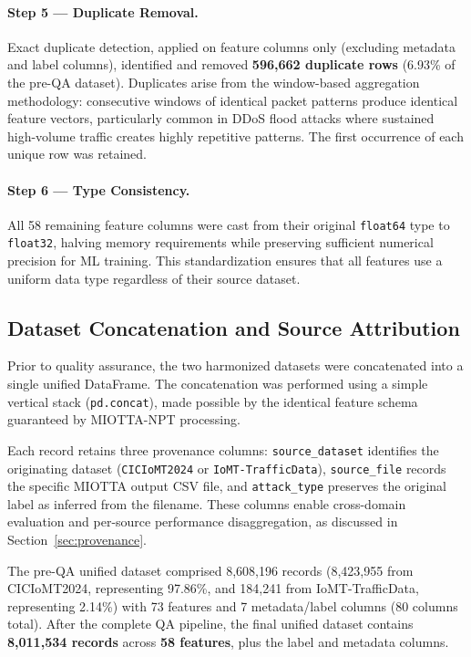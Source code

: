 \paragraph{Step 5 --- Duplicate Removal.}
Exact duplicate detection, applied on feature columns only (excluding metadata and label columns), identified and removed \textbf{596,662 duplicate rows} (6.93\% of the pre-QA dataset). Duplicates arise from the window-based aggregation methodology: consecutive windows of identical packet patterns produce identical feature vectors, particularly common in DDoS flood attacks where sustained high-volume traffic creates highly repetitive patterns. The first occurrence of each unique row was retained.

\paragraph{Step 6 --- Type Consistency.}
All 58 remaining feature columns were cast from their original \texttt{float64} type to \texttt{float32}, halving memory requirements while preserving sufficient numerical precision for ML training. This standardization ensures that all features use a uniform data type regardless of their source dataset.

\subsection{Dataset Concatenation and Source Attribution}
\label{subsec:concatenation}

Prior to quality assurance, the two harmonized datasets were concatenated into a single unified DataFrame. The concatenation was performed using a simple vertical stack (\texttt{pd.concat}), made possible by the identical feature schema guaranteed by MIOTTA-NPT processing.

Each record retains three provenance columns: \texttt{source\_dataset} identifies the originating dataset (\texttt{CICIoMT2024} or \texttt{IoMT-TrafficData}), \texttt{source\_file} records the specific MIOTTA output CSV file, and \texttt{attack\_type} preserves the original label as inferred from the filename. These columns enable cross-domain evaluation and per-source performance disaggregation, as discussed in Section~\ref{sec:provenance}.

The pre-QA unified dataset comprised 8,608,196 records (8,423,955 from CICIoMT2024, representing 97.86\%, and 184,241 from IoMT-TrafficData, representing 2.14\%) with 73 features and 7 metadata/label columns (80 columns total). After the complete QA pipeline, the final unified dataset contains \textbf{8,011,534 records} across \textbf{58 features}, plus the label and metadata columns.

